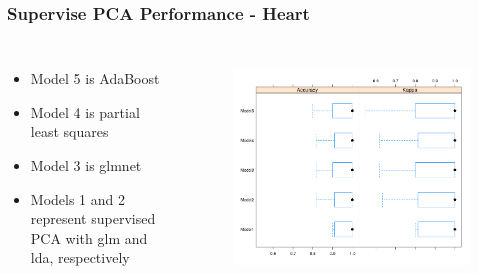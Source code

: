 \documentclass[11pt]{beamer}
\begin{document}
\begin{frame}
\frametitle{Supervise PCA Performance - Heart}
\begin{columns}

{\footnotesize
\begin{itemize}
\item Model 5 is AdaBoost
\item Model 4 is partial least squares
\item Model 3 is glmnet
\item Models 1 and 2 represent supervised PCA with glm and lda, respectively
\end{itemize}
}
%
\begin{figure}
\includegraphics[scale = 0.25]{modelCompareHeart.png} \\
\end{figure}
\end{columns}
\end{frame}
\end{document}
